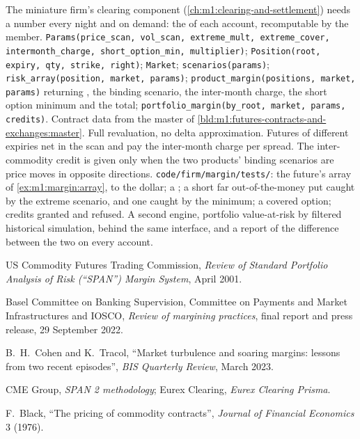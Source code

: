 \begin{build}
 The miniature firm's clearing component
(\cref{ch:m1:clearing-and-settlement}) needs a number every night and on
demand: the  of each account, recomputable by the member.
 \texttt{Params(price\_scan, vol\_scan, extreme\_mult,
extreme\_cover, intermonth\_charge, short\_option\_min, multiplier)};
\texttt{Position(root, expiry, qty, strike, right)}; \texttt{Market};
\texttt{scenarios(params)}; \texttt{risk\_array(position, market, params)};
\texttt{product\_margin(positions, market, params)} returning , the
binding scenario, the inter-month charge, the short option minimum and the
total; \texttt{portfolio\_margin(by\_root, market, params, credits)}.
 Contract data from the master of
\cref{bld:m1:futures-contracts-and-exchanges:master}. Full revaluation, no
delta approximation. Futures of different expiries net in the scan and pay
the inter-month charge per spread. The inter-commodity credit is given only
when the two products' binding scenarios are price moves in opposite
directions.
 \texttt{code/firm/margin/tests/}: the future's
array of \cref{ex:m1:margin:array}, to the dollar; a ; a short
far out-of-the-money put caught by the extreme scenario, and one caught by
the minimum; a covered option; credits granted and refused.
 A second engine, portfolio value-at-risk by filtered
historical simulation, behind the same interface, and a report of the
difference between the two on every account.
\end{build}

\begin{omsources}
\item US Commodity Futures Trading Commission, \emph{Review of Standard
Portfolio Analysis of Risk (``SPAN'') Margin System}, April 2001.
\item Basel Committee on Banking Supervision, Committee on Payments and
Market Infrastructures and IOSCO, \emph{Review of margining practices},
final report and press release, 29 September 2022.
\item B.~H.~Cohen and K.~Tracol, ``Market turbulence and soaring margins:
lessons from two recent episodes'', \emph{BIS Quarterly Review}, March 2023.
\item CME Group, \emph{SPAN 2 methodology}; Eurex Clearing, \emph{Eurex
Clearing Prisma}.
\item F.~Black, ``The pricing of commodity contracts'', \emph{Journal of
Financial Economics} 3 (1976).
\end{omsources}

